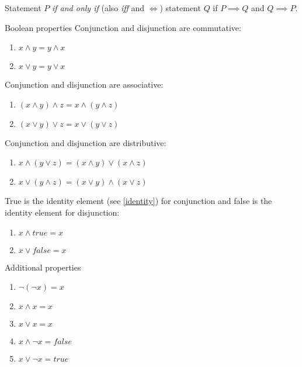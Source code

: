 \documentclass[12pt]{article}
\begin{document}
\begin{defn}\label{iff}
    Statement $P$ \emph{if and only if} (also \emph{iff} and $\iff$) statement $Q$ if $P \implies Q$ and $Q \implies P$.
\end{defn}

\begin{thm}{Boolean properties}\label{boolean-algebraic-properties}\proofbreak
    Conjunction and disjunction are commutative:
    \begin{enumerate}
        \item $x \land y = y \land x$
        \item $x \lor y = y \lor x$
    \end{enumerate}
    
    Conjunction and disjunction are associative:
    \begin{enumerate}
        \item $(x \land y) \land z = x \land (y \land z)$
        \item $(x \lor y) \lor z = x \lor (y \lor z)$
    \end{enumerate}

    Conjunction and disjunction are distributive:
    \begin{enumerate}
        \item $x \land (y \lor z) = (x \land y) \lor (x \land z)$
        \item $x \lor (y \land z) = (x \lor y) \land (x \lor z)$
    \end{enumerate}

    True is the identity element (see \ref{identity}) for conjunction and false is the identity element for disjunction:
    \begin{enumerate}
        \item $x \land true = x$
        \item $x \lor false = x$
    \end{enumerate}
\end{thm}

\begin{thm}{Additional properties}\label{additional-boolean-properties}\proofbreak
    \begin{enumerate}
        \item $\neg(\neg x) = x$
        \item $x \land x = x$
        \item $x \lor x = x$
        \item $x \land \neg x = false$
        \item $x \lor \neg x = true$
    \end{enumerate}
\end{thm}
    
\end{document}
